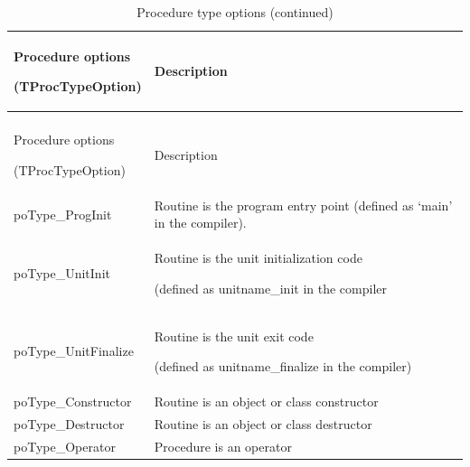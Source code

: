 \documentclass [a4paper,12pt]{article}
\begin{document}
\begin{longtable}{|l|p{10cm}|}
\caption{Procedure type options}\label{tproctypeoption}\\
\hline
Procedure options  \par (TProcTypeOption)& Description \\
\hline
\endfirsthead
\caption{Procedure type options (continued)}\\
\hline
Procedure options  \par (TProcTypeOption)& Description \\
\hline
\endhead
\hline
\endfoot
\textsf{poType{\_}ProgInit}&
    Routine is the program entry point (defined as `\textsf{main}' in
    the compiler). \\
\textsf{poType{\_}UnitInit}&
    Routine is the unit initialization code \par (defined as
    unitname\textsf{{\_}init} in the compiler \\
\textsf{poType{\_}UnitFinalize}&
    Routine is the unit exit code \par (defined as
    unitname\textsf{{\_}finalize} in the compiler) \\
\textsf{poType{\_}Constructor}&
    Routine is an object or class constructor \\
\textsf{poType{\_}Destructor}&
    Routine is an object or class destructor \\
\textsf{poType{\_}Operator}&
    Procedure is an operator \\
\end{longtable}
\end{document}
